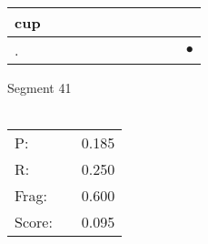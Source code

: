 \documentclass[landscape]{article}
\newcommand{\ssp}{\hspace{2pt}}
\newcommand{\mex}{\cellcolor{g}$\bullet$}
\begin{document}
\begin{tabular}{|l|p{10pt}|p{10pt}|p{10pt}|p{10pt}|p{10pt}|p{10pt}|p{10pt}|p{10pt}|p{10pt}|p{10pt}|}
\hline
\ssp cup \ssp&\hspace{2pt}&\hspace{2pt}&\hspace{2pt}&\hspace{2pt}&\hspace{2pt}&\hspace{2pt}&\hspace{2pt}&\hspace{2pt}&\hspace{2pt}&\hspace{2pt}\\
\hline
\ssp \cellcolor{ref9}. \ssp&\hspace{2pt}&\hspace{2pt}&\hspace{2pt}&\hspace{2pt}&\hspace{2pt}&\hspace{2pt}&\hspace{2pt}&\hspace{2pt}&\hspace{2pt}&\hspace{2pt}\mex\\
\hline
\end{tabular}

\vspace{6pt}
\noindent Segment 41\\\\
\noindent\begin{tabular}{lm{12pt}r}
\hline
P:&&0.185\\
R:&&0.250\\
Frag:&&0.600\\
Score:&&0.095\\
\end{tabular}

\newpage
\end{document}
